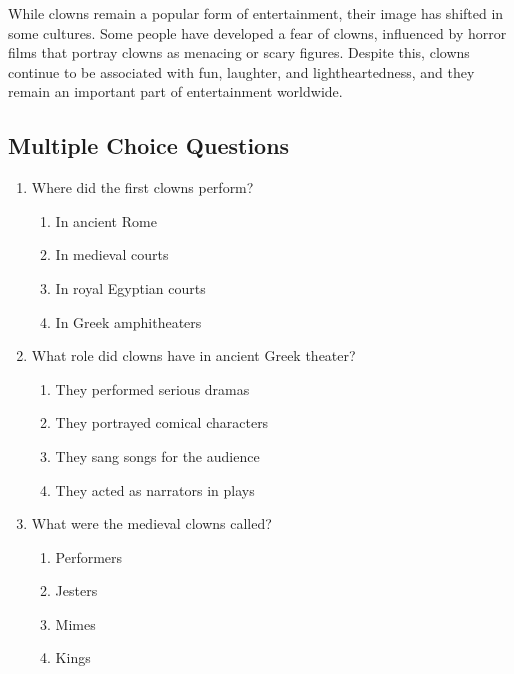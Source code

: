 \documentclass[12pt]{article}
\begin{document}
\begin{tcolorbox}[colframe=black!40, colback=gray!5]
\begin{spacing}{1.15}
While clowns remain a popular form of entertainment, their image has shifted in some cultures. Some people have developed a fear of clowns, influenced by horror films that portray clowns as menacing or scary figures. Despite this, clowns continue to be associated with fun, laughter, and lightheartedness, and they remain an important part of entertainment worldwide.

\end{spacing}

\end{tcolorbox}

\subsection*{Multiple Choice Questions}

\begin{enumerate}

    \item Where did the first clowns perform?

    \begin{enumerate}[label=\Alph*.]
        \item In ancient Rome
        \item In medieval courts
        \item In royal Egyptian courts
        \item In Greek amphitheaters
    \end{enumerate}
    
    \vspace{0.5cm}

    \item What role did clowns have in ancient Greek theater?

    \begin{enumerate}[label=\Alph*.]
        \item They performed serious dramas
        \item They portrayed comical characters
        \item They sang songs for the audience
        \item They acted as narrators in plays
    \end{enumerate}
    
    \vspace{0.5cm}

    \item What were the medieval clowns called?

    \begin{enumerate}[label=\Alph*.]
        \item Performers
        \item Jesters
        \item Mimes
        \item Kings
    \end{enumerate}
    

\end{enumerate}
\end{document}
